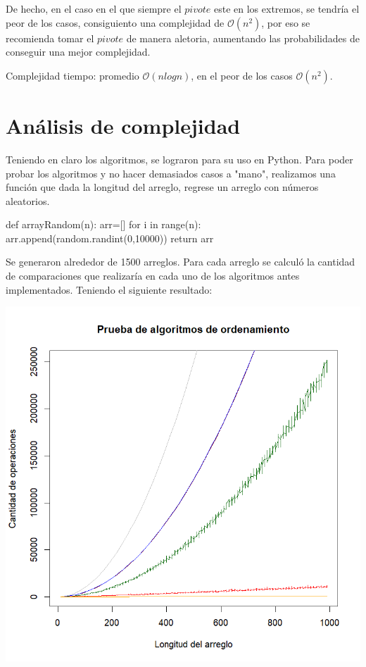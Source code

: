 \documentclass[12pt,a4paper]{article}
\begin{document}
De hecho, en el caso en el que siempre el $pivote$ este en los extremos, se tendr\'ia el peor de los casos, consiguiento una complejidad de $\mathcal{O}(n^2)$, por eso se recomienda tomar el $pivote$ de manera aletoria, aumentando las probabilidades de conseguir una mejor complejidad.
\newline


Complejidad tiempo: promedio $\mathcal{O}(nlog{}n)$, en el peor de los casos $\mathcal{O}(n^2)$.

\section{An\'alisis de complejidad}

Teniendo en claro los algoritmos, se lograron para su uso en Python. Para poder probar los algoritmos y no hacer demasiados casos a "mano", realizamos una funci\'on que dada la longitud del arreglo, regrese un arreglo con n\'umeros aleatorios. 

\begin{python}
def arrayRandom(n):
	arr=[]
	for i in range(n):
		arr.append(random.randint(0,10000))
	return arr
\end{python}

Se generaron alrededor de 1500 arreglos. Para cada arreglo se calcul\'o la cantidad de comparaciones que realizar\'ia en cada uno de los algoritmos antes implementados. Teniendo el siguiente resultado:

\begin{center}
    \includegraphics[width=17 cm]{kuchau.png} 
\end{center}
\end{document}
